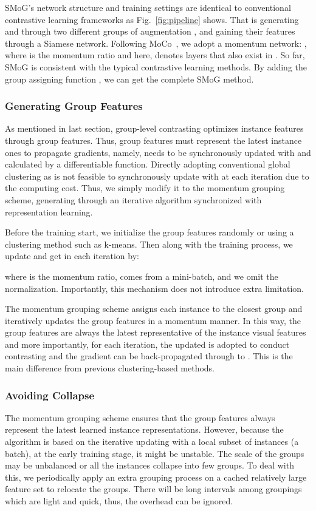 \documentclass[runningheads]{style/llncs}
\begin{document}
SMoG's network structure and training settings are identical to conventional contrastive learning frameworks as Fig.~\ref{fig:pipeline} shows. That is generating  and  through two different groups of augmentation , and gaining their features through a Siamese network. Following MoCo~\cite{moco}, we adopt a momentum network: , where  is the momentum ratio and here,  denotes layers that also exist in . So far, SMoG is consistent with the typical contrastive learning methods. By adding the group assigning function , we can get the complete SMoG method.

\subsubsection{Generating Group Features}
As mentioned in last section, group-level contrasting optimizes instance features through group features. Thus, group features must represent the latest instance ones to propagate gradients, namely,  needs to be synchronously updated with  and calculated by a differentiable function. Directly adopting conventional global clustering as  is not feasible to synchronously update  with  at each iteration due to the computing cost. Thus, we simply modify it to the momentum grouping scheme, generating  through an iterative algorithm synchronized with representation learning.

Before the training start, we initialize the  group features  randomly or using a clustering method such as k-means. Then along with the training process, we update  and get  in each iteration by:

where  is the momentum ratio,  comes from a mini-batch, and we omit the normalization. Importantly, this mechanism does not introduce extra limitation.

The momentum grouping scheme assigns each instance to the closest group and iteratively updates the group features in a momentum manner. In this way, the group features are always the latest representative of the instance visual features and more importantly, for each iteration, the updated  is adopted to conduct contrasting and the gradient can be back-propagated through  to . This is the main difference from previous clustering-based methods. 
\subsubsection{Avoiding Collapse}
The momentum grouping scheme ensures that the group features  always represent the latest learned instance representations. However, because the algorithm is based on the iterative updating with a local subset of instances (a batch), at the early training stage, it might be unstable. The scale of the groups may be unbalanced or all the instances collapse into few groups. To deal with this, we periodically apply an extra grouping process on a cached relatively large feature set to relocate the groups. There will be long intervals among groupings which are light and quick, thus, the overhead can be ignored.
\end{document}
